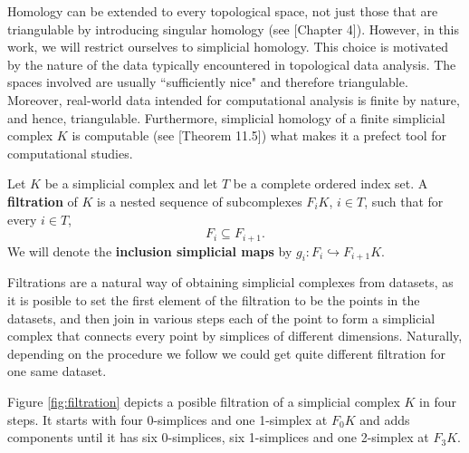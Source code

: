 Homology can be extended to every topological space, not just those that are triangulable by introducing singular homology (see \cite{munkres}[Chapter 4]). However, in this work, we will restrict ourselves to simplicial homology. This choice is motivated by the nature of the data typically encountered in topological data analysis. The spaces involved are usually ``sufficiently nice" and therefore triangulable. Moreover, real-world data intended for computational analysis is finite by nature, and hence, triangulable. Furthermore, simplicial homology of a finite simplicial complex $K$ is computable (see \cite{munkres}[Theorem 11.5]) what makes it a prefect tool for computational studies.

\begin{definition}[Filtration]
    Let $ K $ be a simplicial complex and let $ T $ be a complete ordered index set. A {\bf filtration} of $ K $ is a nested sequence of subcomplexes $ F_i K $, $ i \in T $, such that for every $ i \in T $, 
    \begin{equation}
        F_i \subseteq F_{i+1}.
    \end{equation}
    We will denote the {\bf inclusion simplicial maps} by $ g_i \colon F_i \hookrightarrow F_{i+1} K $.
\end{definition}

Filtrations are a natural way of obtaining simplicial complexes from datasets, as it is posible to set the first element of the filtration to be the points in the datasets, and then join in various steps each of the point to form a simplicial complex that connects every point by simplices of different dimensions. Naturally, depending on the procedure we follow we could get quite different filtration for one same dataset.

\begin{example} \label{ex:filtration}
    Figure \ref{fig:filtration} depicts a posible filtration of a simplicial complex $K$ in four steps. It starts with four 0-simplices and one 1-simplex at $ F_0 K $ and adds components until it has six $0$-simplices, six 1-simplices and one 2-simplex at $ F_3 K $.
    
\end{example}

